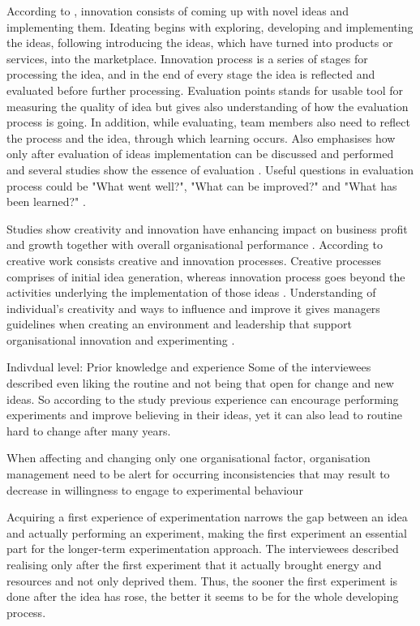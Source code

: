 According to \citet{buijs2007innovation}, innovation consists of coming up with novel ideas and implementing them. Ideating begins with exploring, developing and implementing the ideas, following introducing the ideas, which have turned into products or services, into the marketplace. Innovation process is a series of stages for processing the idea, and in the end of every stage the idea is reflected and evaluated before further processing. Evaluation points stands for usable tool for measuring the quality of idea but gives also understanding of how the evaluation process is going. In addition, while evaluating, team members also need to reflect the process and the idea, through which learning occurs. Also \citep{runco1994problem} emphasises how only after evaluation of ideas implementation can be discussed and performed and several studies show the essence of evaluation \citep{mumford2002leading,vincent2002divergent}. Useful questions in evaluation process could be "What went well?", "What can be improved?" and "What has been learned?" \citep{buijs2007innovation}.

Studies show creativity and innovation have enhancing impact on business profit and growth \citep{nystrom1990organizational} together with overall organisational performance \citep{mumford2002leading}. According to \citet{vincent2002divergent} creative work consists creative and innovation processes. Creative processes comprises of initial idea generation, whereas innovation process goes beyond the activities underlying the implementation of those ideas \citep{vincent2002divergent}. Understanding of individual's creativity and ways to influence and improve it gives managers guidelines when creating an environment and leadership that support organisational innovation and experimenting \citep{redmond1993putting}.

Indivdual level: Prior knowledge and experience 
Some of the interviewees described even liking the routine and not being that open for change and new ideas. So according to the study previous experience can encourage performing experiments and improve believing in their ideas, yet it can also lead to routine hard to change after many years. 

When affecting and changing only one organisational factor, organisation management need to be alert for occurring inconsistencies that may result to decrease in willingness to engage to experimental behaviour \citep{lee2004mixed}

Acquiring a first experience of experimentation narrows the gap between an idea and actually performing an experiment, making the first experiment an essential part for the longer-term experimentation approach. The interviewees described realising only after the first experiment that it actually brought energy and resources and not only deprived them. Thus, the sooner the first experiment is done after the idea has rose, the better it seems to be for the whole developing process.

